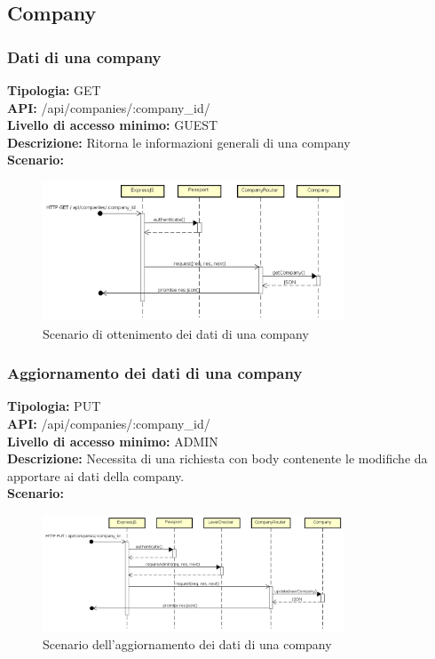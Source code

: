 \newpage
\subsection{Company}
\subsubsection{Dati di una company}
\textbf{Tipologia:} GET \\
\textbf{API:} /api/companies/:company\_id/ \\
\textbf{Livello di accesso minimo:} GUEST \\
\textbf{Descrizione:} Ritorna le informazioni generali di una company \\
\textbf{Scenario:} 
\begin{figure}[h]
\centering
\includegraphics[width=0.8\textwidth]{res/sections/backend/(GET)company.png}
\caption{Scenario di ottenimento dei dati di una company}
\end{figure}

\newpage
\subsubsection{Aggiornamento dei dati di una company}
\textbf{Tipologia:} PUT \\
\textbf{API:} /api/companies/:company\_id/ \\
\textbf{Livello di accesso minimo:} ADMIN \\
\textbf{Descrizione:} Necessita di una richiesta con body contenente le modifiche da apportare ai dati della company. \\
\textbf{Scenario:} 
\begin{figure}[h]
\centering
\includegraphics[width=0.8\textwidth]{res/sections/backend/(PUT)company.png}
\caption{Scenario dell'aggiornamento dei dati di una company}
\end{figure}

